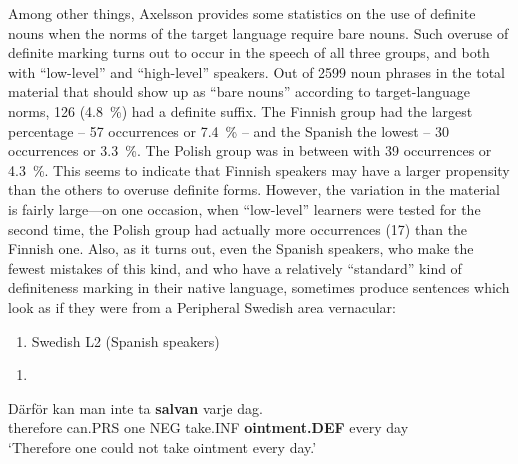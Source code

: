 Among other things, Axelsson provides some statistics on the use of definite nouns when the norms of the target language require bare nouns. Such overuse of definite marking turns out to occur in the speech of all three groups, and both with “low-level” and “high-level” speakers. Out of 2599 noun phrases in the total material that should show up as “bare nouns” according to target-language norms, 126 (4.8~\%) had a definite suffix. The Finnish group had the largest percentage – 57 occurrences or 7.4~\% – and the Spanish the lowest – 30 occurrences or 3.3~\%. The Polish group was in between with 39 occurrences or 4.3~\%. This seems to indicate that Finnish speakers may have a larger propensity than the others to overuse definite forms. However, the variation in the material is fairly large—on one occasion, when “low-level” learners were tested for the second time, the Polish group had actually more occurrences (17) than the Finnish one. Also, as it turns out, even the Spanish speakers, who make the fewest mistakes of this kind, and who have a relatively “standard” kind of definiteness marking in their native language, sometimes produce sentences which look as if they were from a Peripheral Swedish area vernacular:

\begin{enumerate} %
\item 
Swedish L2 (Spanish speakers)

\end{enumerate} %
\setcounter{listLFOxcviiileveli}{0}
\begin{enumerate} %
\item 
\end{enumerate} %
\ea\label{}
\gll Därför  kan  man  inte  ta  \textbf{salvan} varje  dag.  \\


therefore  can.PRS  one  NEG  take.INF  \textbf{ointment.DEF} every  day  \\ %


‘Therefore one could not take ointment every day.’
\z


